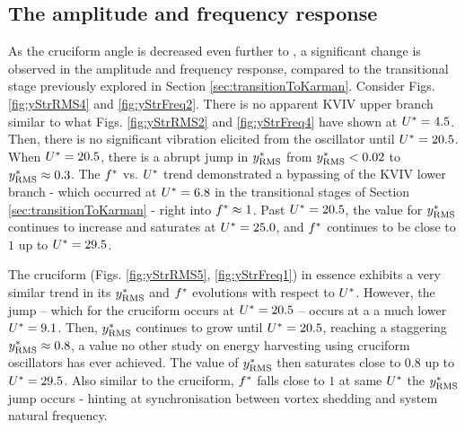 \documentclass[oneside]{utmthesis}
\begin{document}
\subsection{The amplitude and frequency response}\label{ssec:kvivAmpFreqResp}
As the cruciform angle is decreased even further to \angtw{}, a significant change is observed in the amplitude and frequency response, compared to the transitional stage previously explored in Section \ref{sec:transitionToKarman}. Consider Figs. \ref{fig:yStrRMS4} and \ref{fig:yStrFreq2}. There is no apparent KVIV upper branch similar to what  Figs. \ref{fig:yStrRMS2} and \ref{fig:yStrFreq4} have shown at $U^{*} = 4.5$. Then, there is no significant vibration elicited from the oscillator until $U^{*} = 20.5$. When $U^{*} = 20.5$, there is a abrupt jump in $y^{*}_{\text{RMS}}$ from $y^{*}_{\text{RMS}} < 0.02$ to $y^{*}_{\text{RMS}} \approx 0.3$. The $f^{*}$ vs. $U^{*}$ trend demonstrated a bypassing of the KVIV lower branch - which occurred at $U^{*} = 6.8$ in the transitional stages of Section \ref{sec:transitionToKarman} - right into $f^{*} \approx 1$. Past $U^{*} = 20.5$, the value for $y^{*}_{\text{RMS}}$ continues to increase and saturates at $U^{*} = 25.0$, and $f^{*}$ continues to be close to $1$ up to $U^{*} = 29.5$.

The \angon{} cruciform (Figs. \ref{fig:yStrRMS5}, \ref{fig:yStrFreq1}) in essence exhibits a very similar trend in its $y^{*}_{\text{RMS}}$ and $f^{*}$ evolutions with respect to $U^{*}$. However, the jump -- which for the \angtw{} cruciform occurs at $U^{*} = 20.5$ -- occurs at a a much lower $U^{*} = 9.1$. Then, $y^{*}_{\text{RMS}}$ continues to grow until $U^{*} = 20.5$, reaching a staggering $y^{*}_{\text{RMS}} \approx 0.8$, a value no other study on energy harvesting using cruciform oscillators has ever achieved. The value of $y^{*}_{\text{RMS}}$ then saturates close to $0.8$ up to $U^{*} = 29.5$. Also similar to the \angtw{} cruciform, $f^{*}$ falls close to $1$ at same $U^{*}$ the $y^{*}_{\text{RMS}}$ jump occurs - hinting at synchronisation between vortex shedding and system natural frequency.
\end{document}
